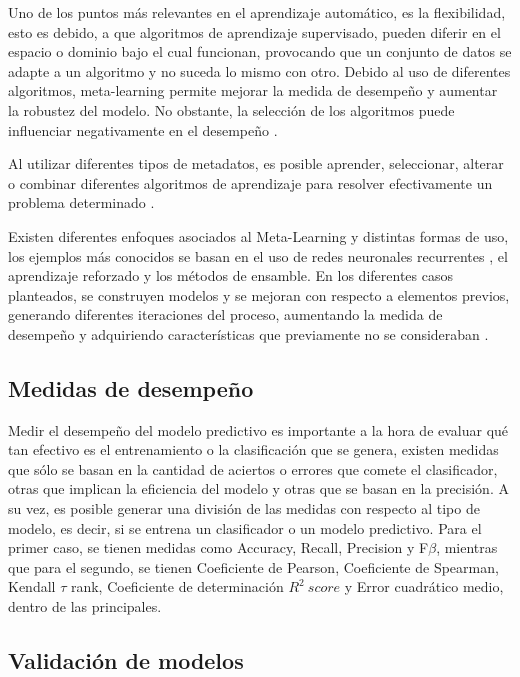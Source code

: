 Uno de los puntos más relevantes en el aprendizaje automático, es la flexibilidad, esto es debido, a que algoritmos de aprendizaje supervisado, pueden diferir en el espacio o dominio bajo el cual funcionan, provocando que un conjunto de datos se adapte a un algoritmo y no suceda lo mismo con otro. Debido al uso de diferentes algoritmos, meta-learning permite mejorar la medida de desempeño y aumentar la robustez del modelo. No obstante, la selección de los algoritmos puede influenciar negativamente en el desempeño \cite{hochreiter2001learning}.

Al utilizar diferentes tipos de metadatos, es posible aprender, seleccionar, alterar o combinar diferentes algoritmos de aprendizaje para resolver efectivamente un problema determinado \cite{schmidhuber1987evolutionary}. 

Existen diferentes enfoques asociados al Meta-Learning y distintas formas de uso, los ejemplos más conocidos se basan en el uso de redes neuronales recurrentes \cite{andrychowicz2016learning}, el aprendizaje reforzado \cite{schmidhuber1995learning} y los métodos de ensamble. En los diferentes casos planteados, se construyen modelos y se mejoran con respecto a elementos previos, generando diferentes iteraciones del proceso, aumentando la medida de desempeño y adquiriendo características que previamente no se consideraban \cite{finn2017model}.

\subsection{Medidas de desempeño \label{desempeno}}

Medir el desempeño del modelo predictivo es importante a la hora de evaluar qué tan efectivo es el entrenamiento o la clasificación que se genera, existen medidas que sólo se basan en la cantidad de aciertos o errores que comete el clasificador, otras que implican la eficiencia del modelo y otras que se basan en la precisión. A su vez, es posible generar una división de las medidas con respecto al tipo de modelo, es decir, si se entrena un clasificador o un modelo predictivo. Para el primer caso, se tienen medidas como Accuracy, Recall, Precision y F$\beta$, mientras que para el segundo, se tienen Coeficiente de Pearson, Coeficiente de Spearman, Kendall $\tau$ rank, Coeficiente de determinación $R^{2}\ score$ y Error cuadrático medio, dentro de las principales.


\subsection{Validación de modelos}


